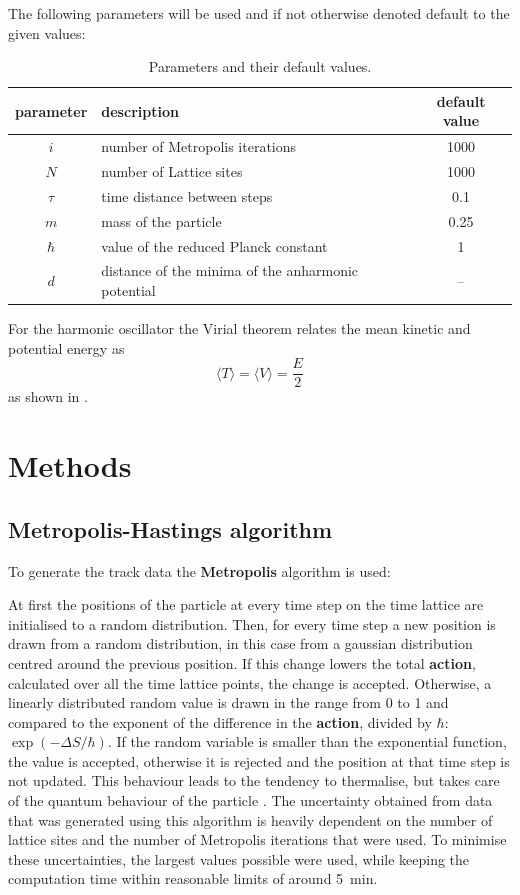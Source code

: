 \documentclass{scrartcl}
\begin{document}
		The following parameters will be used and if not otherwise denoted default to the given values:
		\begin{table}[H]
			\centering
			\begin{tabular}{c|l|c}
				parameter & description & default value\\
				\hline
				$i$ & number of Metropolis iterations & 1000\\
				$N$ & number of Lattice sites & 1000\\
				$\tau$ & time distance between steps & 0.1\\
				$m$ & mass of the particle & 0.25\\
				$\hbar$ & value of the reduced Planck constant & 1\\
				$d$ & distance of the minima of the anharmonic potential & --\\
			\end{tabular}
			\caption{Parameters and their default values.}
			\label{eq:parameters}
		\end{table}
		For the harmonic oscillator the Virial theorem relates the mean kinetic and potential energy as
		\begin{equation}
			\langle T \rangle = \langle V \rangle = \frac E2
			\label{eq:virial}
		\end{equation}
		as shown in \cite{carinena_falceto_ranada}.

	\section{Methods}
	\subsection{Metropolis-Hastings algorithm}
		To generate the track data the \textbf{Metropolis} algorithm is used:

		At first the positions of the particle at every time step on the time lattice are initialised to a random distribution.
		Then, for every time step a new position is drawn from a random distribution, in this case from a gaussian distribution centred around the previous position.
		If this change lowers the total \textbf{action}, calculated over all the time lattice points, the change is accepted.
		Otherwise, a linearly distributed random value is drawn in the range from 0 to 1 and compared to the exponent of the difference in the \textbf{action}, divided by $\hbar$: $\exp(-\Delta S / \hbar)$.
		If the random variable is smaller than the exponential function, the value is accepted, otherwise it is rejected and the position at that time step is not updated.
		This behaviour leads to the tendency to thermalise, but takes care of the quantum behaviour of the particle \cite{creutz_freedman, rodgers_raes}.
		The uncertainty obtained from data that was generated using this algorithm is heavily dependent on the number of lattice sites and the number of Metropolis iterations that were used.
		To minimise these uncertainties, the largest values possible were used, while keeping the computation time within reasonable limits of around \SI{5}{\minute}.
\end{document}
